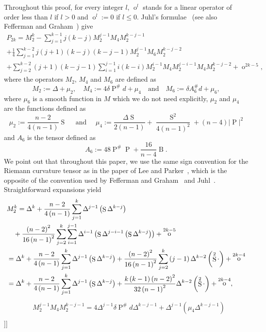 \documentclass[reqno]{amsart}
\numberwithin{equation}{section}
\DeclareMathOperator{\Scal}{S}
\DeclareMathOperator{\Schouten}{P}
\DeclareMathOperator{\Bach}{B}
\DeclareMathOperator{\smallo}{o}
\newcommand{\<}{\left<}
\renewcommand{\>}{\right>}
\renewcommand{\[}{\left[}
\renewcommand{\]}{\right]}
\renewcommand{\(}{\left(}
\renewcommand{\)}{\right)}
\begin{document}
\[\[\proof[Proof of Step~\ref{Step1}]
Throughout this proof, for every integer $l$, $\smallo^l$ stands for a linear operator of order less than $l$ if $l>0$ and $\smallo^{l}:=0$ if $l\le0$. Juhl's formulae~\cite{Juhl} (see also Fefferman and Graham~\cite{FefGra3}) give
\begin{multline}\label{Step1Eq3}
P_{2k}=M_2^k-\sum_{j=1}^{k-1}j\(k-j\)M_2^{j-1}M_4M_2^{k-j-1}\\
+\frac{1}{4}\sum_{j=1}^{k-2}j\(j+1\)\(k-j\)\(k-j-1\)M_2^{j-1}M_6M_2^{k-j-2}\\
+\sum_{j=2}^{k-2}\(j+1\)\(k-j-1\)\sum_{i=1}^{j-1}i\(k-i\)M_2^{i-1}M_4M_2^{j-i-1}M_4M_2^{k-j-2}+\smallo^{2k-5},
\end{multline}
where the operators $M_2$, $M_4$ and $M_6$ are defined as
$$M_2:=\Delta+\mu_2,\quad M_4:=4\delta\Schouten^\#d+\mu_4\quad \text{and}\quad M_6:=\delta A_6^\#d+\mu_6,$$
where $\mu_6$ is a smooth function in $M$ which we do not need explicitly, $\mu_2$ and $\mu_4$ are the functions defined as
$$\mu_2:=\frac{n-2}{4\(n-1\)}\Scal\quad\text{ and }\quad \mu_4:=\frac{\Delta\Scal}{2\(n-1\)}+\frac{\Scal^2}{4\(n-1\)^2}+\(n-4\)\left|\Schouten\right|^2$$
and $A_6$ is the tensor defined as
$$A_6:=48\Schouten^{\#}\Schouten+\frac{16}{n-4}\Bach.$$
We point out that throughout this paper, we use the same sign convention for the Riemann curvature tensor as in the paper of Lee and Parker~\cite{LeePar}, which is the opposite of the convention used by Fefferman and Graham~\cite{FefGra3} and Juhl~\cite{Juhl}. Straightforward expansions yield
\begin{align}\label{Step1Eq6}
&M_2^k=\Delta^k+\frac{n-2}{4\(n-1\)}\sum_{j=1}^k\Delta^{j-1}\(\Scal\Delta^{k-j}\)\nonumber\\
&\quad+\frac{\(n-2\)^2}{16\(n-1\)^2}\sum_{j=2}^k\sum_{i=1}^{j-1}\Delta^{i-1}\(\Scal\Delta^{j-i-1}\(\Scal\Delta^{k-j}\)\)+\smallo^{2k-5}\allowdisplaybreaks\nonumber\\
&=\Delta^k+\frac{n-2}{4\(n-1\)}\sum_{j=1}^k\Delta^{j-1}\(\Scal\Delta^{k-j}\)+\frac{\(n-2\)^2}{16\(n-1\)^2}\sum_{j=2}^k\(j-1\)\Delta^{k-2}\(\Scal^2\cdot\)+\smallo^{2k-4}\allowdisplaybreaks\nonumber\\
&=\Delta^k+\frac{n-2}{4\(n-1\)}\sum_{j=1}^k\Delta^{j-1}\(\Scal\Delta^{k-j}\)+\frac{k\(k-1\)\(n-2\)^2}{32\(n-1\)^2}\Delta^{k-2}\(\Scal^2\cdot\)+\smallo^{2k-4},
\end{align}
\begin{align}\label{Step1Eq7}
&M_2^{j-1}M_4M_2^{k-j-1}=4\Delta^{j-1}\delta\Schouten^\#d\Delta^{k-j-1}+\Delta^{j-1}\(\mu_4\Delta^{k-j-1}\)\nonumber\\

\end{align}\]\]
\end{document}
